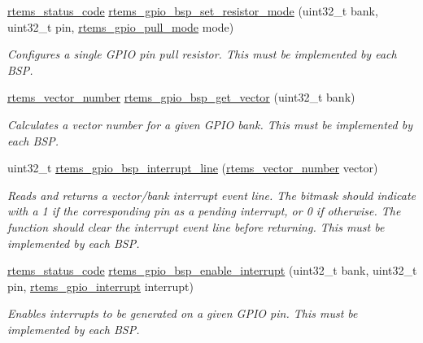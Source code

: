 \begin{DoxyCompactItemize}
\mbox{\hyperlink{group__ClassicStatus_ga545d41846817eaba6143d52ee4d9e9fe}{rtems\+\_\+status\+\_\+code}} \mbox{\hyperlink{rpi-gpio_8c_a8a25b03ab6aa4456d19717824579cb73}{rtems\+\_\+gpio\+\_\+bsp\+\_\+set\+\_\+resistor\+\_\+mode}} (uint32\+\_\+t bank, uint32\+\_\+t pin, \mbox{\hyperlink{gpio_8h_add28697559b41893e0754f35509bf835}{rtems\+\_\+gpio\+\_\+pull\+\_\+mode}} mode)
\begin{DoxyCompactList}\small\item\em Configures a single G\+P\+IO pin pull resistor. This must be implemented by each B\+SP. \end{DoxyCompactList}\item 
\mbox{\hyperlink{group__ClassicINTR_ga3e434c197d99f128e78cae4d9358bd8b}{rtems\+\_\+vector\+\_\+number}} \mbox{\hyperlink{rpi-gpio_8c_afd37aeabdf0cc490a9940f0998f7d668}{rtems\+\_\+gpio\+\_\+bsp\+\_\+get\+\_\+vector}} (uint32\+\_\+t bank)
\begin{DoxyCompactList}\small\item\em Calculates a vector number for a given G\+P\+IO bank. This must be implemented by each B\+SP. \end{DoxyCompactList}\item 
uint32\+\_\+t \mbox{\hyperlink{rpi-gpio_8c_ab709f5c3dfd804da18fbb9a9a40182a0}{rtems\+\_\+gpio\+\_\+bsp\+\_\+interrupt\+\_\+line}} (\mbox{\hyperlink{group__ClassicINTR_ga3e434c197d99f128e78cae4d9358bd8b}{rtems\+\_\+vector\+\_\+number}} vector)
\begin{DoxyCompactList}\small\item\em Reads and returns a vector/bank interrupt event line. The bitmask should indicate with a 1 if the corresponding pin as a pending interrupt, or 0 if otherwise. The function should clear the interrupt event line before returning. This must be implemented by each B\+SP. \end{DoxyCompactList}\item 
\mbox{\hyperlink{group__ClassicStatus_ga545d41846817eaba6143d52ee4d9e9fe}{rtems\+\_\+status\+\_\+code}} \mbox{\hyperlink{rpi-gpio_8c_a5600f7ffdca5e11b5a607136f00a80ad}{rtems\+\_\+gpio\+\_\+bsp\+\_\+enable\+\_\+interrupt}} (uint32\+\_\+t bank, uint32\+\_\+t pin, \mbox{\hyperlink{gpio_8h_a941c7497a28a335b0b05e1ebfd471ddc}{rtems\+\_\+gpio\+\_\+interrupt}} interrupt)
\begin{DoxyCompactList}\small\item\em Enables interrupts to be generated on a given G\+P\+IO pin. This must be implemented by each B\+SP. \end{DoxyCompactList}\item 

\end{DoxyCompactItemize}
